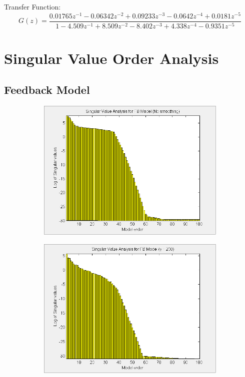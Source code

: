 \begin{landscape}
Transfer Function:
\[G(z) =\frac{0.01765 z^{-1} - 0.06342 z^{-2} + 0.09233 z^{-3} - 0.0642 z^{-4} + 0.0181 z^{-5}}{ 1 - 4.509 z^{-1} + 8.509 z^{-2} - 8.402 z^{-3} + 4.338 z^{-4} - 0.9351 z^{-5} }\] 




\clearpage

\chapter{Singular Value Order Analysis}\label{sec:svd}

\section{Feedback Model}

\begin{figure}[H]
\centering
\begin{subfigure}[b]{0.38\textwidth}
\includegraphics[width=1.0\textwidth]{pics/SVD_FB_inf}

\label{pic:}
\end{subfigure}\;\begin{subfigure}[b]{0.38\textwidth}
\includegraphics[width=1.0\textwidth]{pics/SVD_FB_200}


\end{subfigure}
\end{figure}
\end{landscape}
